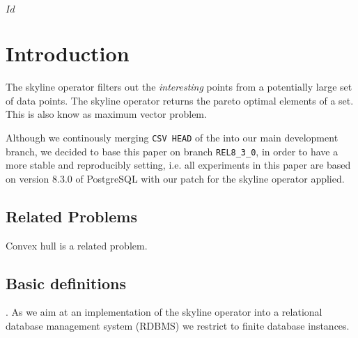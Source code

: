 
\svnInfo $Id$

\newcommand\schema[1]{\ensuremath{\mathcal{#1}}}
\newcommand\relation[1]{\ensuremath{\textnormal{\bf\textsf{#1}}}}

\newcommand\imp{\Rightarrow}

\newcommand\inlinesql[1]{{\tt #1}}
\newcommand\srcref[1]{{\tt #1}}
\newcommand\postgresdocu[2]{\href{http://www.postgresql.org/docs/8.3/static/#1}{#2}}

\newtheorem{definition}{Definition}
\newtheorem{lemma}{Lemma}

\chapter{Introduction\revision}
\label{chap:Introduction}

The skyline operator \citep{Borzsonyi2001} filters out the \emph{interesting} points from a potentially large set of data points. The skyline operator returns the pareto optimal elements of a set. This is also know as maximum vector problem.

Although we continously merging \texttt{CSV HEAD} of the  
into our main development branch, we decided to base this paper on branch \texttt{REL8\_3\_0}, 
in order to have a more stable and reproducibly setting, i.e. all experiments in this paper are based on version 8.3.0 of PostgreSQL with our patch for the skyline operator applied.

\section{Related Problems}
Convex hull is a related problem.



\newcommand\dominates{\ensuremath{\succ}\xspace}

\clearpage 
{}
\section{Basic definitions}
. As we aim at an implementation of the skyline operator into a relational database management system (RDBMS) we restrict to finite database instances.

